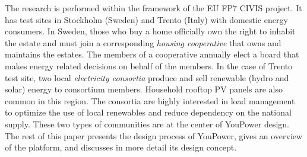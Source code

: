 The research is performed within the framework of the EU FP7 CIVIS project. It has test sites in Stockholm (Sweden) and Trento (Italy) with domestic energy consumers. 
% 
In Sweden, those who buy a home officially own the right to inhabit the estate and must join a corresponding \textit{housing cooperative} 
that owns and maintains the estates. 
The members of a cooperative annually elect a board that makes energy related decisions on behalf of the members. 
In the case of Trento test site, two local \textit{electricity consortia} produce and sell renewable (hydro and solar) energy to consortium members. Household rooftop PV panels are also common in this region.  The consortia are highly interested in load management to optimize the use of local renewables and reduce dependency on the national supply. 
These two types of communities are at the center of YouPower design. 
% 
The rest of this paper presents the design process of YouPower, gives an overview of the platform, and discusses in more detail its design concept.

